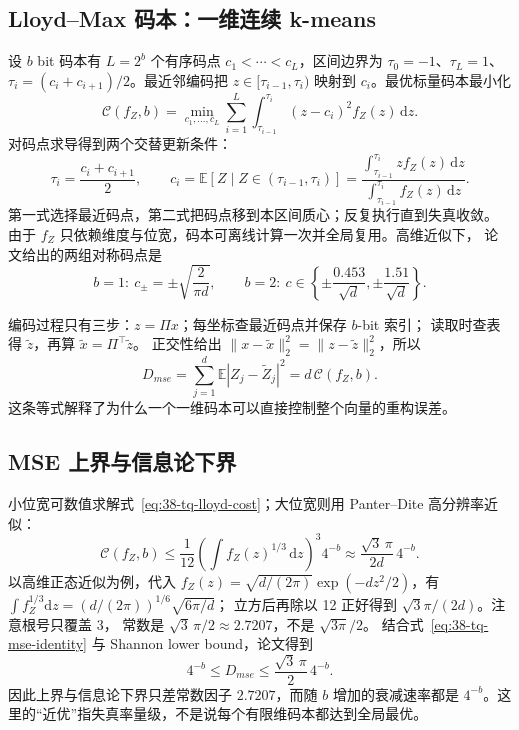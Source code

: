 \subsection{Lloyd--Max 码本：一维连续 k-means}

设 $b$ bit 码本有 $L=2^b$ 个有序码点 $c_1<\cdots<c_L$，区间边界为
$\tau_0=-1$、$\tau_L=1$、$\tau_i=(c_i+c_{i+1})/2$。最近邻编码把
$z\in[\tau_{i-1},\tau_i)$ 映射到 $c_i$。最优标量码本最小化
\begin{equation}
  \mathcal C(f_Z,b)=
  \min_{c_1,\ldots,c_L}\sum_{i=1}^{L}
  \int_{\tau_{i-1}}^{\tau_i}(z-c_i)^2f_Z(z)\,\mathrm dz.
  \label{eq:38-tq-lloyd-cost}
\end{equation}
对码点求导得到两个交替更新条件：
\begin{equation}
  \tau_i=\frac{c_i+c_{i+1}}2,\qquad
  c_i=\mathbb E[Z\mid Z\in(\tau_{i-1},\tau_i)]
      =\frac{\int_{\tau_{i-1}}^{\tau_i}z f_Z(z)\,\mathrm dz}
             {\int_{\tau_{i-1}}^{\tau_i}  f_Z(z)\,\mathrm dz}.
  \label{eq:38-tq-lloyd-update}
\end{equation}
第一式选择最近码点，第二式把码点移到本区间质心；反复执行直到失真收敛。
由于 $f_Z$ 只依赖维度与位宽，码本可离线计算一次并全局复用。高维近似下，
论文给出的两组对称码点是
\begin{equation}
  b=1:\ c_\pm=\pm\sqrt{\frac{2}{\pi d}},\qquad
  b=2:\ c\in\left\{\pm\frac{0.453}{\sqrt d},
                    \pm\frac{1.51}{\sqrt d}\right\}.
  \label{eq:38-tq-codebooks}
\end{equation}

编码过程只有三步：$z=\Pi x$；每坐标查最近码点并保存 $b$-bit 索引；
读取时查表得 $\widetilde z$，再算 $\widetilde x=\Pi^{\top}\widetilde z$。
正交性给出 $\|x-\widetilde x\|_2^2=\|z-\widetilde z\|_2^2$，所以
\begin{equation}
  D_{mse}=\sum_{j=1}^{d}\mathbb E|Z_j-\widetilde Z_j|^2
  =d\,\mathcal C(f_Z,b).
  \label{eq:38-tq-mse-identity}
\end{equation}
这条等式解释了为什么一个一维码本可以直接控制整个向量的重构误差。

\subsection{MSE 上界与信息论下界}

小位宽可数值求解式~\ref{eq:38-tq-lloyd-cost}；大位宽则用
Panter--Dite 高分辨率近似：
\begin{equation}
  \mathcal C(f_Z,b)\le\frac1{12}
  \left(\int f_Z(z)^{1/3}\,\mathrm dz\right)^3 4^{-b}
  \approx\frac{\sqrt3\,\pi}{2d}\,4^{-b}.
  \label{eq:38-tq-panter}
\end{equation}
以高维正态近似为例，代入
$f_Z(z)=\sqrt{d/(2\pi)}\exp(-dz^2/2)$，有
$\int f_Z^{1/3}\mathrm dz=(d/(2\pi))^{1/6}\sqrt{6\pi/d}$；
立方后再除以 12 正好得到 $\sqrt3\pi/(2d)$。注意根号只覆盖 3，
常数是 $\sqrt3\,\pi/2\approx2.7207$，不是 $\sqrt{3\pi}/2$。
结合式~\ref{eq:38-tq-mse-identity} 与 Shannon lower bound，论文得到
\begin{equation}
  4^{-b}\le D_{mse}\le\frac{\sqrt3\,\pi}{2}\,4^{-b}.
  \label{eq:38-tq-mse-bounds}
\end{equation}
因此上界与信息论下界只差常数因子 $2.7207$，而随 $b$ 增加的衰减速率都是
$4^{-b}$。这里的“近优”指失真率量级，不是说每个有限维码本都达到全局最优。

